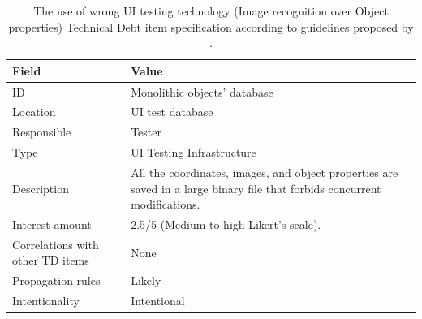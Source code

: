 	\begin{table}[!htbp]
		\centering
		\tabulinesep=1.2mm
		\begin{tabu} to \textwidth {|X|X[3]|}

			\hline
			\textbf{Field} & \textbf{Value} \\
			\hline

			ID & Monolithic objects' database\\
			\hline

			Location & UI test database \\
			\hline

			Responsible & Tester \\
			\hline

			Type & UI Testing Infrastructure \\
			\hline

			Description & All the coordinates, images, and object properties are saved in a large binary file that forbids concurrent modifications.\\
			\hline



			Interest amount &  2.5/5 (Medium to high Likert's scale). \\
			\hline



			Correlations with other TD items & None\\
			\hline



			Propagation rules & Likely\\
			\hline

			Intentionality & Intentional \\
			\hline

		\end{tabu}
		\caption[Use of wrong UI testing technology - Image recognition over Objects' properties - TD item specification]{The use of wrong UI testing technology (Image recognition over Object properties) Technical Debt item specification according to guidelines proposed by \cite{mapping_study_td}.}
		\label{tab:res-monolithic-db}
	\end{table}


